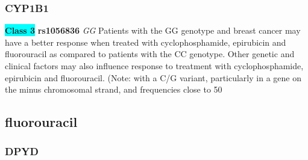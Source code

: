 \documentclass{book}
\begin{document}
\subsubsection{ CYP1B1 }

\begin{center}
\textbf{\colorbox{cyan} {Class 3}} \textbf{ rs1056836 } \textit{ GG }
Patients with the GG genotype and breast cancer may have a better response when treated with cyclophosphamide, epirubicin and fluorouracil as compared to patients with the CC genotype. Other genetic and clinical factors may also influence response to treatment with cyclophosphamide, epirubicin and fluorouracil.  (Note: with a C/G variant, particularly in a gene on the minus chromosomal strand, and frequencies close to 50%


\end{center}\subsection{ fluorouracil }


\subsubsection{ DPYD }
\end{document}
